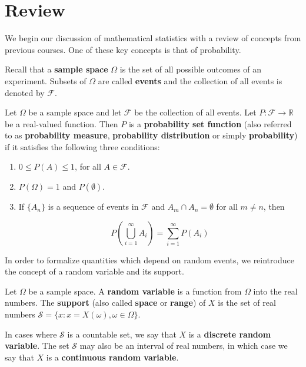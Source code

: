 \section{Review}

We begin our discussion of mathematical statistics with a review of concepts from previous courses. One of these key concepts is that of probability.

Recall that a \textbf{sample space} $\Omega$ is the set of all possible outcomes of an experiment. Subsets of $\Omega$ are called \textbf{events} and the collection of all events is denoted by $\mathcal F$.

\begin{definition}
	Let $\Omega$ be a sample space and let $\mathcal F$ be the collection of all events. Let $P:\mathcal F\to\mathbb R$ be a real-valued function. Then $P$ is a \textbf{probability set function} (also referred to as \textbf{probability measure}, \textbf{probability distribution} or simply \textbf{probability}) if it satisfies the following three conditions:
	\begin{enumerate}
		\item $0\leq P(A)\leq 1$, for all $A\in\mathcal F$.
		\item $P(\Omega)=1$ and $P(\emptyset)$.
		\item If $\{A_n\}$ is a sequence of events in $\mathcal F$ and $A_m\cap A_n=\emptyset$ for all $m\neq n$, then

		$$P\left(\bigcup_{i=1}^\infty A_i\right)=\sum_{i=1}^\infty P(A_i)$$
	\end{enumerate}
\end{definition}

In order to formalize quantities which depend on random events, we reintroduce the concept of a random variable and its support.

\begin{definition}
	Let $\Omega$ be a sample space. A \textbf{random variable} is a function from $\Omega$ into the real numbers. The \textbf{support} (also called \textbf{space} or \textbf{range}) of $X$ is the set of real numbers $\mathcal S=\{x:x=X(\omega),\omega\in \Omega\}$.
\end{definition}

In cases where $\mathcal S$ is a countable set, we say that $X$ is a \textbf{discrete random variable}. The set $\mathcal S$ may also be an interval of real numbers, in which case we say that $X$ is a \textbf{continuous random variable}.

